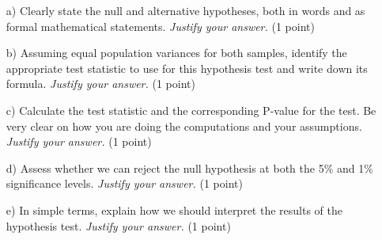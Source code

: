 \documentclass{article}
\begin{document}
\begin{enumerate}
\item[a)] Clearly state the null and alternative hypotheses, both in words and as formal mathematical statements. \emph{Justify your answer.} (1 point)
\begin{center}
\end{center}

\item[b)] Assuming equal population variances for both samples, identify the appropriate test statistic to use for this hypothesis test and write down its formula. \emph{Justify your answer.} (1 point)
\begin{center}
\end{center}

\item[c)] Calculate the test statistic and the corresponding P-value for the test. Be very clear on how you are doing the computations and your assumptions. \emph{Justify your answer.} (1 point)
\begin{center}
\end{center}

\item[d)] Assess whether we can reject the null hypothesis at both the 5\% and 1\% significance levels. \emph{Justify your answer.} (1 point)
\begin{center}
\end{center}

\item[e)] In simple terms, explain how we should interpret the results of the hypothesis test. \emph{Justify your answer.} (1 point)
\begin{center}
\end{center}

\end{enumerate}
\end{document}
